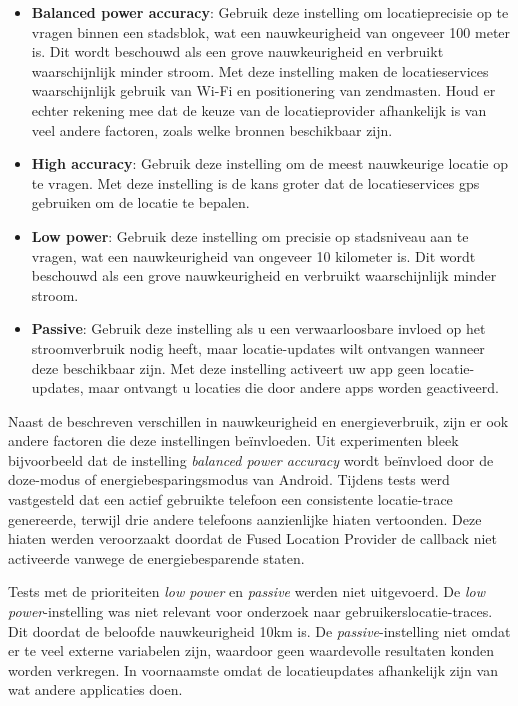 \begin{itemize}
    \item \textbf{Balanced power accuracy}: Gebruik deze instelling om locatieprecisie op te vragen binnen een stadsblok, wat een nauwkeurigheid van ongeveer 100 meter is. Dit wordt beschouwd als een grove nauwkeurigheid en verbruikt waarschijnlijk minder stroom. Met deze instelling maken de locatieservices waarschijnlijk gebruik van Wi-Fi en positionering van zendmasten. Houd er echter rekening mee dat de keuze van de locatieprovider afhankelijk is van veel andere factoren, zoals welke bronnen beschikbaar zijn.
    \item \textbf{High accuracy}: Gebruik deze instelling om de meest nauwkeurige locatie op te vragen. Met deze instelling is de kans groter dat de locatieservices \gls{gps} gebruiken om de locatie te bepalen.
    \item \textbf{Low power}: Gebruik deze instelling om precisie op stadsniveau aan te vragen, wat een nauwkeurigheid van ongeveer 10 kilometer is. Dit wordt beschouwd als een grove nauwkeurigheid en verbruikt waarschijnlijk minder stroom.
    \item \textbf{Passive}: Gebruik deze instelling als u een verwaarloosbare invloed op het stroomverbruik nodig heeft, maar locatie-updates wilt ontvangen wanneer deze beschikbaar zijn. Met deze instelling activeert uw app geen locatie-updates, maar ontvangt u locaties die door andere apps worden geactiveerd.
\end{itemize}

Naast de beschreven verschillen in nauwkeurigheid en energieverbruik, zijn er ook andere factoren die deze instellingen beïnvloeden. Uit experimenten bleek bijvoorbeeld dat de instelling \textit{balanced power accuracy} wordt beïnvloed door de doze-modus of energiebesparingsmodus van Android. Tijdens tests werd vastgesteld dat een actief gebruikte telefoon een consistente locatie-trace genereerde, terwijl drie andere telefoons aanzienlijke hiaten vertoonden. Deze hiaten werden veroorzaakt doordat de Fused Location Provider de callback niet activeerde vanwege de energiebesparende staten.

Tests met de prioriteiten \textit{low power} en \textit{passive} werden niet uitgevoerd. De \textit{low power}-instelling was niet relevant voor onderzoek naar gebruikerslocatie-traces. Dit doordat de beloofde nauwkeurigheid 10km is. De \textit{passive}-instelling niet omdat er te veel externe variabelen zijn, waardoor geen waardevolle resultaten konden worden verkregen.
In voornaamste omdat de locatieupdates afhankelijk zijn van wat andere applicaties doen.

